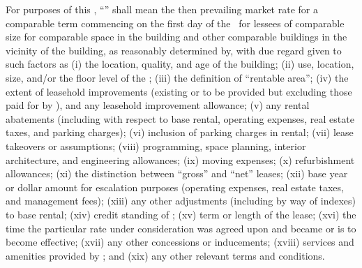 For purposes of this \amendmentTitle, “\fmv” shall mean the then prevailing market rate for a comparable term commencing on the first day of the \optionITerm\ for lessees of comparable size for comparable space in the building and other comparable buildings in the vicinity of the building, as reasonably determined by\lessor, with due regard given to such factors as (i) the location, quality, and age of the building; (ii) use, location, size, and/or the floor level of the \premises; (iii) the definition of “rentable area”; (iv) the extent of leasehold improvements (existing or to be provided but excluding those paid for by \lessee), and any leasehold improvement allowance; (v) any rental abatements (including with respect to base rental, operating expenses, real estate taxes, and parking charges); (vi) inclusion of parking charges in rental; (vii) lease takeovers or assumptions; (viii) programming, space planning, interior architecture, and engineering allowances; (ix) moving expenses; (x) refurbishment allowances; (xi) the distinction between “gross” and “net” leases; (xii) base year or dollar amount for escalation purposes (operating expenses, real estate taxes, and management fees); (xiii) any other adjustments (including by way of indexes) to base rental; (xiv) credit standing of \lessee; (xv) term or length of the lease; (xvi) the time the particular rate under consideration was agreed upon and became or is to become effective; (xvii) any other concessions or inducements; (xviii) services and amenities provided by \lessor; and (xix) any other relevant terms and conditions.
